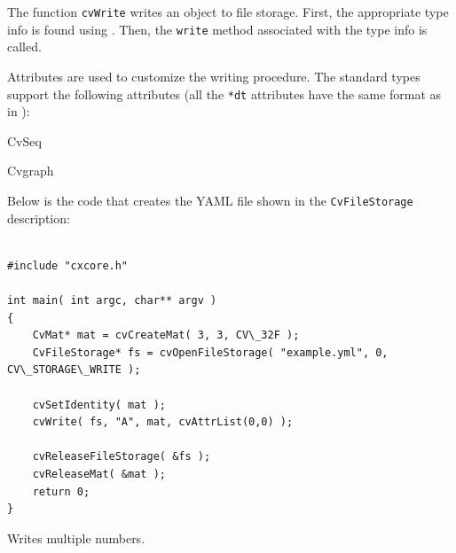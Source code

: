 The function \texttt{cvWrite} writes an object to file storage. First, the appropriate type info is found using . Then, the \texttt{write} method associated with the type info is called.

Attributes are used to customize the writing procedure. The standard types support the following attributes (all the \texttt{*dt} attributes have the same format as in ):

CvSeq
  \begin{description}
  \end{description}
Cvgraph
  \begin{description}
  \end{description}

Below is the code that creates the YAML file shown in the \texttt{CvFileStorage} description:

\begin{lstlisting}

#include "cxcore.h"

int main( int argc, char** argv )
{
    CvMat* mat = cvCreateMat( 3, 3, CV\_32F );
    CvFileStorage* fs = cvOpenFileStorage( "example.yml", 0, CV\_STORAGE\_WRITE );

    cvSetIdentity( mat );
    cvWrite( fs, "A", mat, cvAttrList(0,0) );

    cvReleaseFileStorage( &fs );
    cvReleaseMat( &mat );
    return 0;
}

\end{lstlisting}


\label{WriteRawData}

Writes multiple numbers.



